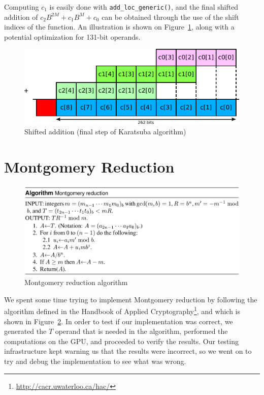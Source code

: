 \documentclass[12pt, a4paper]{report}
\begin{document}
\begin{sloppypar}
Computing $c_1$ is easily done with \verb+add_loc_generic()+, and the final
shifted addition of $c_2 B^{2M} + c_1 B^{M} + c_0$ can be obtained through
the use of the shift indices of the function.
An illustration is shown on Figure~\ref{fig:shift_addition_karatsuba_final},
along with a potential optimization for 131-bit operands.

\begin{figure}[h]
\centering
\includegraphics[scale=0.8]{figs/shift_addition_karatsuba_final}
\caption{Shifted addition (final step of Karatsuba algorithm)}
\label{fig:shift_addition_karatsuba_final}
\end{figure}

\section{Montgomery Reduction}
\begin{figure}[h]
\centering
\includegraphics[width=\linewidth]{figs/montgomery_reduction}
\caption{Montgomery reduction algorithm}
\label{fig:montgomery_reduction}
\end{figure}

We spent some time trying to implement Montgomery reduction by following the
algorithm defined in the Handbook of Applied Cryptography\footnote{\url{http://cacr.uwaterloo.ca/hac/}}, and which is shown
in Figure~\ref{fig:montgomery_reduction}.
In order to test if our implementation was correct, we generated the $T$ operand
that is needed in the algorithm, performed the computations on the GPU, and proceeded to
verify the results.
Our testing infrastructure kept warning us that the results were incorrect, so we went on to try
and debug the implementation to see what was wrong.


\end{sloppypar}
\end{document}
